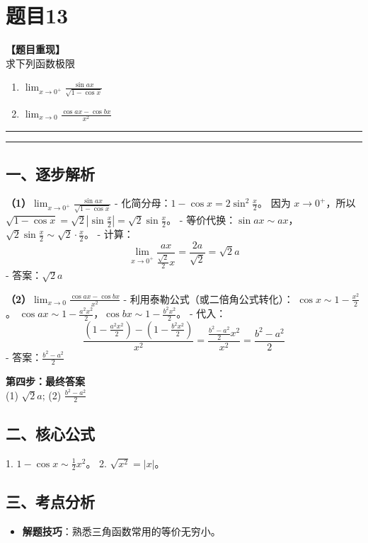 \documentclass[12pt, a4paper]{ctexart}
\newcommand{\AnalysisSeparator}{
    \par\noindent\rule{\textwidth}{0.5pt}\vspace{0.2em}\hrule\vspace{0.5em} %
}
\newenvironment{RedAnalysis}{
    \par
    \color{red} %
}{
    \par
    \color{black} %
}
\begin{document}
\section*{题目13}

\textbf{【题目重现】} \\
求下列函数极限
\begin{enumerate}
    \item $ \lim_{x \to 0^{+}} \frac{\sin ax}{\sqrt{1 - \cos x}} $
    \item $ \lim_{x \to 0} \frac{\cos ax - \cos bx}{x^{2}} $
\end{enumerate}

\AnalysisSeparator

\begin{RedAnalysis}

\subsection*{一、逐步解析}

\textbf{（1）$ \lim_{x \to 0^{+}} \frac{\sin ax}{\sqrt{1 - \cos x}} $}
   - 化简分母：$1-\cos x = 2\sin^2 \frac{x}{2}$。
     因为 $x \to 0^+$，所以 $\sqrt{1-\cos x} = \sqrt{2}|\sin \frac{x}{2}| = \sqrt{2}\sin \frac{x}{2}$。
   - 等价代换：$\sin ax \sim ax$，$\sqrt{2}\sin \frac{x}{2} \sim \sqrt{2} \cdot \frac{x}{2}$。
   - 计算：
     \[ \lim_{x \to 0^+} \frac{ax}{\frac{\sqrt{2}}{2}x} = \frac{2a}{\sqrt{2}} = \sqrt{2}a \]
   - 答案：$\sqrt{2}a$

\textbf{（2）$ \lim_{x \to 0} \frac{\cos ax - \cos bx}{x^{2}} $}
   - 利用泰勒公式（或二倍角公式转化）：
     $\cos x \sim 1 - \frac{x^2}{2}$。
     $\cos ax \sim 1 - \frac{a^2x^2}{2}$，$\cos bx \sim 1 - \frac{b^2x^2}{2}$。
   - 代入：
     \[ \frac{(1 - \frac{a^2x^2}{2}) - (1 - \frac{b^2x^2}{2})}{x^2} = \frac{\frac{b^2 - a^2}{2}x^2}{x^2} = \frac{b^2 - a^2}{2} \]
   - 答案：$\frac{b^2-a^2}{2}$

\textbf{第四步：最终答案} \\
(1) $\sqrt{2}a$; (2) $\frac{b^2-a^2}{2}$

\subsection*{二、核心公式}
1. $1-\cos x \sim \frac{1}{2}x^2$。
2. $\sqrt{x^2} = |x|$。

\subsection*{三、考点分析}
\begin{itemize}
    \item \textbf{解题技巧}：熟悉三角函数常用的等价无穷小。
\end{itemize}

\end{RedAnalysis}
\end{document}
